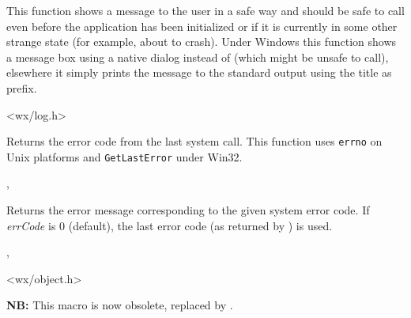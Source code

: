 This function shows a message to the user in a safe way and should be safe to
call even before the application has been initialized or if it is currently in
some other strange state (for example, about to crash). Under Windows this
function shows a message box using a native dialog instead of
 (which might be unsafe to call), elsewhere
it simply prints the message to the standard output using the title as prefix.







<wx/log.h>


\label{wxsyserrorcode}


Returns the error code from the last system call. This function uses
{\tt errno} on Unix platforms and {\tt GetLastError} under Win32.


,


\label{wxsyserrormsg}


Returns the error message corresponding to the given system error code. If
{\it errCode} is $0$ (default), the last error code (as returned by
) is used.


,


\label{trace}


<wx/object.h>


{\bf NB:} This macro is now obsolete, replaced by .

